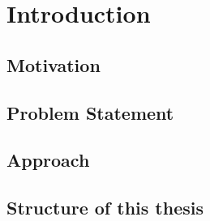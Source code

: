 \chapter{Introduction}
\label{chapter:Introduction}

\section{Motivation}

\section{Problem Statement}

\section{Approach}


\section{Structure of this thesis}
